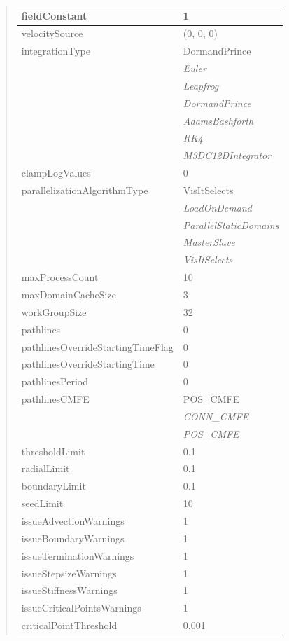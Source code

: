 \documentclass[letterpaper,10pt,english]{sphinxmanual}
\begin{document}
\begin{quote}
\begin{longtable}{|l|l|}
fieldConstant
 & 
1
\\
\hline
velocitySource
 & 
(0, 0, 0)
\\
\hline
integrationType
 & 
DormandPrince
\\
\hline & 
\emph{Euler}
\\
\hline & 
\emph{Leapfrog}
\\
\hline & 
\emph{DormandPrince}
\\
\hline & 
\emph{AdamsBashforth}
\\
\hline & 
\emph{RK4}
\\
\hline & 
\emph{M3DC12DIntegrator}
\\
\hline
clampLogValues
 & 
0
\\
\hline
parallelizationAlgorithmType
 & 
VisItSelects
\\
\hline & 
\emph{LoadOnDemand}
\\
\hline & 
\emph{ParallelStaticDomains}
\\
\hline & 
\emph{MasterSlave}
\\
\hline & 
\emph{VisItSelects}
\\
\hline
maxProcessCount
 & 
10
\\
\hline
maxDomainCacheSize
 & 
3
\\
\hline
workGroupSize
 & 
32
\\
\hline
pathlines
 & 
0
\\
\hline
pathlinesOverrideStartingTimeFlag
 & 
0
\\
\hline
pathlinesOverrideStartingTime
 & 
0
\\
\hline
pathlinesPeriod
 & 
0
\\
\hline
pathlinesCMFE
 & 
POS\_CMFE
\\
\hline & 
\emph{CONN\_CMFE}
\\
\hline & 
\emph{POS\_CMFE}
\\
\hline
thresholdLimit
 & 
0.1
\\
\hline
radialLimit
 & 
0.1
\\
\hline
boundaryLimit
 & 
0.1
\\
\hline
seedLimit
 & 
10
\\
\hline
issueAdvectionWarnings
 & 
1
\\
\hline
issueBoundaryWarnings
 & 
1
\\
\hline
issueTerminationWarnings
 & 
1
\\
\hline
issueStepsizeWarnings
 & 
1
\\
\hline
issueStiffnessWarnings
 & 
1
\\
\hline
issueCriticalPointsWarnings
 & 
1
\\
\hline
criticalPointThreshold
 & 
0.001
\\
\hline\end{longtable}

\end{quote}
\end{document}
